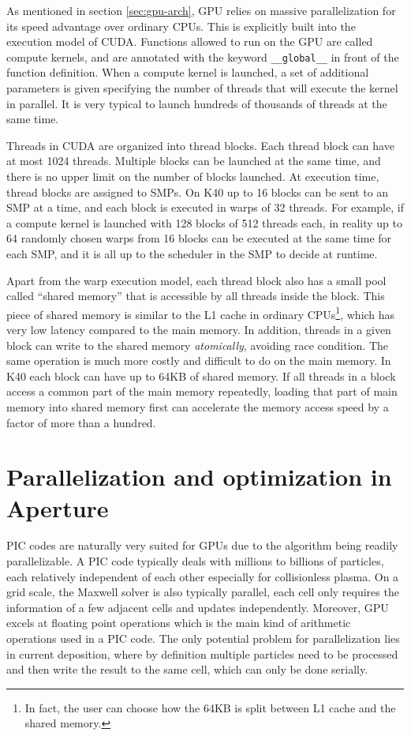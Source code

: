 As mentioned in section \ref{sec:gpu-arch}, GPU relies on massive
parallelization for its speed advantage over ordinary CPUs. This is explicitly
built into the execution model of CUDA. Functions allowed to run on the GPU are
called compute kernels, and are annotated with the keyword \verb!__global__! in
front of the function definition. When a compute kernel is launched, a set of
additional parameters is given specifying the number of threads that will
execute the kernel in parallel. It is very typical to launch hundreds of
thousands of threads at the same time.

Threads in CUDA are organized into thread blocks. Each thread block can have at
most 1024 threads. Multiple blocks can be launched at the same time, and there
is no upper limit on the number of blocks launched. At execution time, thread
blocks are assigned to SMPs. On K40 up to 16 blocks can be sent to an SMP at a
time, and each block is executed in warps of 32 threads. For example, if a
compute kernel is launched with 128 blocks of 512 threads each, in reality up to
64 randomly chosen warps from 16 blocks can be executed at the same time for
each SMP, and it is all up to the scheduler in the SMP to decide at runtime.

Apart from the warp execution model, each thread block also has a small pool
called ``shared memory'' that is accessible by all threads inside the block.
This piece of shared memory is similar to the L1 cache in ordinary
CPUs\footnote{In fact, the user can choose how the 64KB is split between L1
  cache and the shared memory.}, which has very low latency compared to the main
memory. In addition, threads in a given block can write to the shared memory
{\it atomically}, avoiding race condition. The same operation is much more
costly and difficult to do on the main memory. In K40 each block can have up to
64KB of shared memory. If all threads in a block access a common part of the
main memory repeatedly, loading that part of main memory into shared memory
first can accelerate the memory access speed by a factor of more than a hundred.


\section{Parallelization and optimization in Aperture}
\label{sec:optimization}

PIC codes are naturally very suited for GPUs due to the algorithm being readily
parallelizable. A PIC code typically deals with millions to billions of
particles, each relatively independent of each other especially for
collisionless plasma. On a grid scale, the Maxwell solver is also typically
parallel, each cell only requires the information of a few adjacent cells and
updates independently. Moreover, GPU excels at floating point operations which
is the main kind of arithmetic operations used in a PIC code. The only
potential problem for parallelization lies in current deposition, where by
definition multiple particles need to be processed and then write the result to
the same cell, which can only be done serially.

